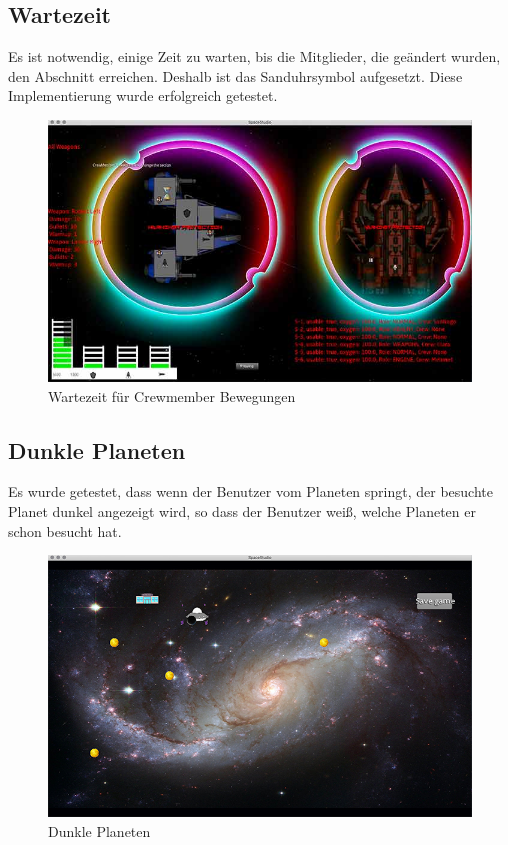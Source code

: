 \documentclass[12pt]{article}
\begin{document}
\subsection{Wartezeit}
Es ist notwendig, einige Zeit zu warten, bis die Mitglieder, die geändert wurden, den Abschnitt erreichen. Deshalb ist das Sanduhrsymbol aufgesetzt. Diese Implementierung wurde erfolgreich getestet.
\begin{figure}[htp]
\centering
\includegraphics[scale=0.6]{TestProtocolBilder/timewaiting@0,25x.jpg}
\caption{Wartezeit für Crewmember Bewegungen}
\end{figure}
\newpage
\subsection{Dunkle Planeten}
Es wurde getestet, dass wenn der Benutzer vom Planeten springt, der besuchte Planet dunkel angezeigt wird, so dass der Benutzer weiß, welche Planeten er schon besucht hat.
\begin{figure}[htp]
\centering
\includegraphics[scale=0.6]{TestProtocolBilder/besuchtePlanet.jpg}
\caption{Dunkle Planeten}
\end{figure}
\newpage
\end{document}
